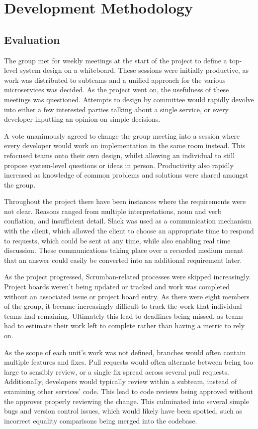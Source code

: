 \section{Development Methodology}

  \subsection{Evaluation}
  \par
  The group met for weekly meetings at the start of the project to define a top-level system design on a whiteboard. These sessions were initially productive, as work was distributed to subteams and a unified approach for the various microservices was decided. As the project went on, the usefulness of these meetings was questioned. Attempts to design by committee would rapidly devolve into either a few interested parties talking about a single service, or every developer inputting an opinion on simple decisions.

  \par
  A vote unanimously agreed to change the group meeting into a session where every developer would work on implementation in the same room instead. This refocused teams onto their own design, whilst allowing an individual to still propose system-level questions or ideas in person. Productivity also rapidly increased as knowledge of common problems and solutions were shared amongst the group.

  \par
  Throughout the project there have been instances where the requirements were not clear. Reasons ranged from multiple interpretations, noun and verb conflation, and insufficient detail. Slack was used as a communication mechanism with the client, which allowed the client to choose an appropriate time to respond to requests, which could be sent at any time, while also enabling real time discussion. These communications taking place over a recorded medium meant that an answer could easily be converted into an additional requirement later.

  \par
  As the project progressed, Scrumban-related processes were skipped increasingly. Project boards weren't being updated or tracked and work was completed without an associated issue or project board entry. As there were eight members of the group, it became increasingly difficult to track the work that individual teams had remaining. Ultimately this lead to deadlines being missed, as teams had to estimate their work left to complete rather than having a metric to rely on.

  \par
  As the scope of each unit's work was not defined, branches would often contain multiple features and fixes. Pull requests would often alternate between being too large to sensibly review, or a single fix spread across several pull requests. Additionally, developers would typically review within a subteam, instead of examining other services' code. This lead to code reviews being approved without the approver properly reviewing the change. This culminated into several simple bugs and version control issues, which would likely have been spotted, such as incorrect equality comparisons being merged into the codebase.
